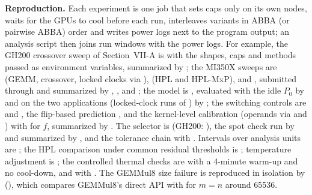 \documentclass[conference]{IEEEtran}
\begin{document}
\textbf{Reproduction.} Each experiment is one job that sets caps only on its own nodes, waits for the GPUs to cool
before each run, interleaves variants in ABBA (or pairwise ABBA) order and writes power logs next to the program output;
an analysis script then joins run windows with the power logs. For example, the GH200 crossover sweep of
Section~VII-A is  with the shapes, caps and methods passed as
environment variables, summarized by ; the MI350X sweeps are
 (GEMM, crossover, locked clocks via ),
 (HPL and HPL-MxP),  and , submitted through
 and summarized by , ,
 and ; the model is , evaluated with the
idle $P_0$ by  and on the two applications (locked-clock runs of ) by
; the switching controls are  and , the flip-based
prediction , and the kernel-level calibration  (operands via
 and ) with  for $f$, summarized by
. The selector is  (GH200: ), the spot check
 run by  and summarized by , and the tolerance chain
 with . Intervals over analysis units are ; the HPL comparison under common residual thresholds is
; temperature adjustment is
; the controlled thermal checks are  with a 4-minute warm-up and no cool-down,
and  with . The GEMMul8 size failure is reproduced in isolation by
 (), which compares GEMMul8's direct API with 
for $m=n$ around 65536.




\end{document}
